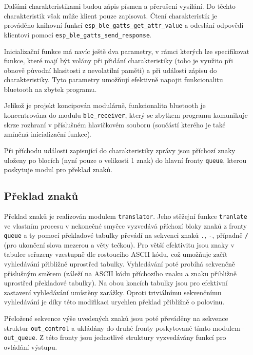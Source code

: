 \documentclass[10pt]{article}
\begin{document}
\par Dalšími charakteristikami budou zápis písmen a přerušení vysílání. Do těchto charakteristik však může klient pouze zapisovat. Čtení charakteristik je prováděno knihovní funkcí \verb|esp_ble_gatts_get_attr_value| a odeslání odpovědi klientovi pomocí \verb|esp_ble_gatts_send_response|.
\par Inicializační funkce má navíc ještě dva parametry, v rámci kterých lze specifikovat funkce, které mají být volány při přidání charakteristiky (toho je využito při obnově původní hlasitosti z nevolatilní paměti) a při události zápisu do charakteristiky. Tyto parametry umožňují efektivně napojit funkcionalitu bluetooth na zbytek programu.
\par Jelikož je projekt koncipován modulárně, funkcionalita bluetooth je koncentrována do modulu \verb|ble_receiver|, který se zbytkem programu komunikuje skrze rozhraní v příslušném hlavičkovém souboru (součástí kterého je také zmíněná inicializační funkce).
\par Při příchodu události zapisující do charakteristiky zprávy jsou příchozí znaky uloženy po blocích (nyní pouze o velikosti 1 znak) do hlavní fronty \verb|queue|, kterou poskytuje modul pro překlad znaků. 

\subsection{Překlad znaků}
\par Překlad znaků je realizován modulem \verb|translator|. Jeho stěžejní funkce \verb|tranlate| ve vlastním procesu v nekonečné smyčce vyzvedává příchozí bloky znaků z fronty \verb|queue| a ty pomocí překladové tabulky převádí na sekvenci znaků \verb|.|, \verb|-|, případně \verb|/| (pro ukončení slova mezerou a věty tečkou). Pro větší efektivitu jsou znaky v tabulce seřazeny vzestupně dle rostoucího ASCII kódu, což umožňuje začít vyhledávání přibližně uprostřed tabulky. Vyhledávání poté probíhá sekvenčně příslušným směrem (záleží na ASCII kódu příchozího znaku a znaku přibližně uprostřed překladové tabulky). Na obou koncích tabulky jsou pro efektivní zastavení vyhledávání umístěny zarážky. Oproti triviálnímu sekvenčnímu vyhledávání je díky této modifikaci urychlen překlad přibližně o polovinu.
\par Přeložené sekvence výše uvedených znaků jsou poté převáděny na sekvence struktur \verb|out_control| a ukládány do druhé fronty poskytované tímto modulem\,--\,\verb|out_queue|. Z této fronty jsou jednotlivé struktury vyzvedávány funkcí pro ovládání výstupu.
\end{document}
